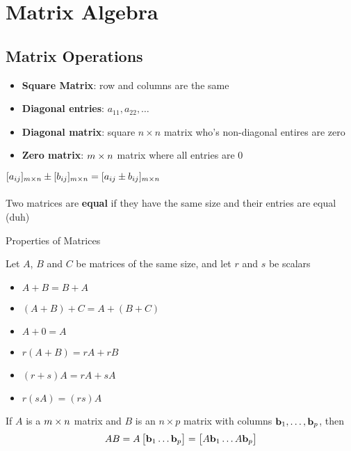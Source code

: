 \documentclass{report}
\begin{document}
\chapter{Matrix Algebra}

\section{Matrix Operations}
\begin{itemize}
    \item \textbf{Square Matrix}: row and columns are the same
    \item \textbf{Diagonal entries}: $a_{11}, a_{22}, \ldots$
    \item \textbf{Diagonal matrix}: square $n \times n$ matrix who's non-diagonal entires are zero
    \item \textbf{Zero matrix}: $m \times n$ matrix where all entries are 0
\end{itemize}

$[a_{ij}]_{m \times n} \pm [b_{ij}]_{m \times n} = [a_{ij} \pm b_{ij}]_{m \times n}$
\\\\
Two matrices are \textbf{equal} if they have the same size and their entries are equal (duh)

\setcounter{theorem}{0}
\setcounter{definition}{0}
\begin{theorem}Properties of Matrices
\begin{tcolorbox}[colback=blue!5!white, colframe=blue!75!black]
Let $A$, $B$ and $C$ be matrices of the same size, and let $r$ and $s$ be scalars
\begin{itemize}
    \item $A + B = B + A$
    \item $(A + B) + C = A + (B + C)$
    \item $A + 0 = A$
    \item $r(A + B) = rA + rB$
    \item $(r + s)A = rA + sA$
    \item $r(sA) = (rs)A$
\end{itemize}
\end{tcolorbox}
\end{theorem}

\begin{definition}
    If $A$ is a $m \times n$ matrix and $B$ is an $n \times p$ matrix with columns
$\mathbf{b}_1, \ldots, \mathbf{b}_p$, then 
\[
AB = A\begin{bmatrix}\mathbf{b}_1 \ldots \mathbf{b}_p\end{bmatrix}
    = \begin{bmatrix}A\mathbf{b}_1 \ldots A\mathbf{b}_p\end{bmatrix}
\]
\end{definition}
\end{document}
